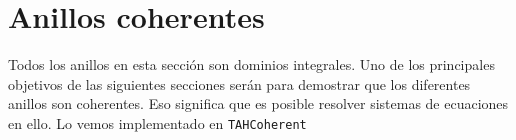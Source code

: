 \chapter{Anillos coherentes}\label{sec:coherentHas}
Todos los anillos en esta sección son dominios integrales. Uno de los principales objetivos de las siguientes secciones serán para demostrar que los diferentes anillos son coherentes. Eso significa que es posible resolver sistemas de ecuaciones en ello. Lo vemos implementado en \texttt{TAHCoherent}